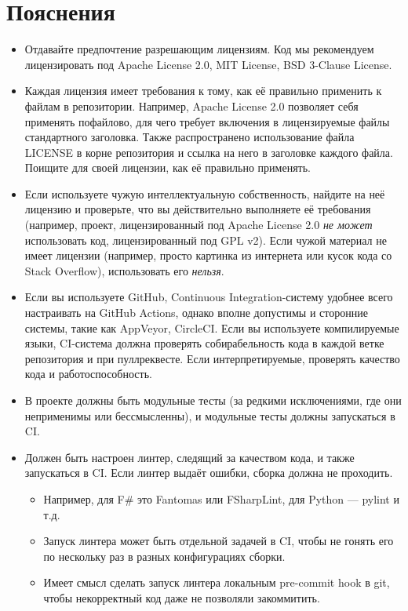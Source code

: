 \documentclass[a5paper]{article}
\begin{document}
\section*{Пояснения}

\begin{itemize}
    \item Отдавайте предпочтение разрешающим лицензиям. Код мы рекомендуем лицензировать под Apache License 2.0, MIT License, BSD 3-Clause License.
    \item Каждая лицензия имеет требования к тому, как её правильно применить к файлам в репозитории. Например, Apache License 2.0 позволяет себя применять пофайлово, для чего требует включения в лицензируемые файлы стандартного заголовка. Также распространено использование файла LICENSE в корне репозитория и ссылка на него в заголовке каждого файла. Поищите для своей лицензии, как её правильно применять.
    \item Если используете чужую интеллектуальную собственность, найдите на неё лицензию и проверьте, что вы действительно выполняете её требования (например, проект, лицензированный под Apache License 2.0 \emph{не может} использовать код, лицензированный под GPL v2). Если чужой материал не имеет лицензии (например, просто картинка из интернета или кусок кода со Stack Overflow), использовать его \emph{нельзя}.
    \item Если вы используете GitHub, Continuous Integration-систему удобнее всего настраивать на GitHub Actions, однако вполне допустимы и сторонние системы, такие как AppVeyor, CircleCI. Если вы используете компилируемые языки, CI-система должна проверять собирабельность кода в каждой ветке репозитория и при пуллреквесте. Если интерпретируемые, проверять качество кода и работоспособность.
    \item В проекте должны быть модульные тесты (за редкими исключениями, где они неприменимы или бессмысленны), и модульные тесты должны запускаться в CI.
    \item Должен быть настроен линтер, следящий за качеством кода, и также запускаться в CI. Если линтер выдаёт ошибки, сборка должна не проходить.
    \begin{itemize}
        \item Например, для F\# это Fantomas или FSharpLint, для Python --- pylint и т.д.
        \item Запуск линтера может быть отдельной задачей в CI, чтобы не гонять его по нескольку раз в разных конфигурациях сборки.
        \item Имеет смысл сделать запуск линтера локальным pre-commit hook в git, чтобы некорректный код даже не позволяли закоммитить.

\end{itemize}
\end{itemize}
\end{document}
